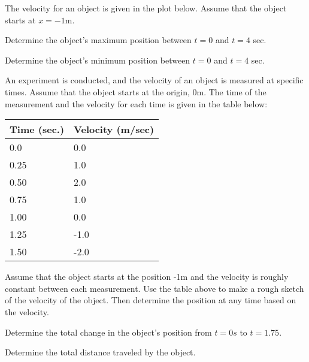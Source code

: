 \begin{problem}
\item The velocity for an object is given in the plot below. Assume
  that the object starts at $x=-1$m.

    \scalebox{0.7}{}

    \begin{subproblem}
    \item Determine the object's maximum position between $t=0$ and
      $t=4$ sec.
      \vfill
    \item Determine the object's minimum position between $t=0$ and
      $t=4$ sec.
      \vfill
    \end{subproblem}

\clearpage

\item An experiment is conducted, and the velocity of an object is
  measured at specific times. Assume that the object starts at the
  origin, 0m. The time of the measurement and the
  velocity for each time is given in the table below: \\
  \begin{tabular}{l|l}
    Time (sec.) & Velocity (m/sec) \\ \hline
    0.0  & 0.0 \\
    0.25 & 1.0 \\
    0.50 & 2.0 \\
    0.75 & 1.0 \\
    1.00 & 0.0 \\
    1.25 & -1.0 \\
    1.50 & -2.0
  \end{tabular}

  \begin{subproblem}
  \item Assume that the object starts at the position -1m and the
    velocity is roughly constant between each measurement. Use the
    table above to make a rough sketch of the velocity of the
    object. Then determine the position at any time based on the
    velocity.

    \scalebox{0.7}{}

  \item Determine the total change in the object's position from $t=0s$
    to $t=1.75$.

    \vfill

  \item Determine the total distance traveled by the object.

    \vfill

  \end{subproblem}



\end{problem}


